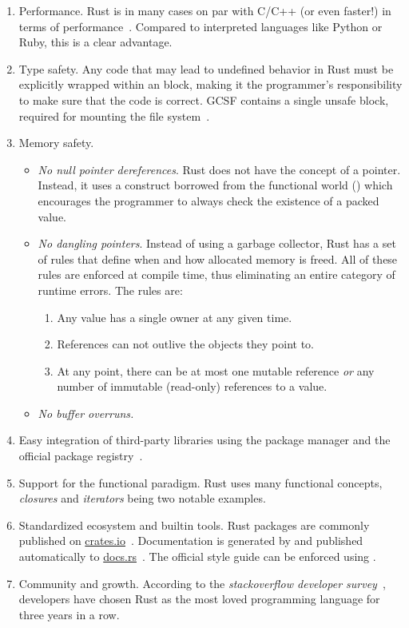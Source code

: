 \begin{enumerate}
  \itemsep0em
  \item Performance. Rust is in many cases on par with C/C++ (or even faster!) in terms of performance~\cite{rust_vs_cpp_benchmark}. Compared to interpreted languages like Python or Ruby, this is a clear advantage.
  \item Type safety. Any code that may lead to undefined behavior in Rust must be explicitly wrapped within an  block, making it the programmer's responsibility to make sure that the code is correct. GCSF contains a single unsafe block, required for mounting the file system~\cite{fuse_spawn_mount_unsafe}.
  \item Memory safety.
    \begin{itemize}
      \itemsep0em
      \item \emph{No null pointer dereferences}. Rust does not have the concept of a  pointer. Instead, it uses a construct borrowed from the functional world () which encourages the programmer to always check the existence of a packed value.
      \item \emph{No dangling pointers}. Instead of using a garbage collector, Rust has a set of rules that define when and how allocated memory is freed. All of these rules are enforced at compile time, thus eliminating an entire category of runtime errors. The rules are:
      \begin{enumerate}
        \itemsep0em
        \item Any value has a single owner at any given time.
        \item References can not outlive the objects they point to.
        \item At any point, there can be at most one mutable reference \emph{or} any number of immutable (read-only) references to a value.
      \end{enumerate}
      \item \emph{No buffer overruns.}
    \end{itemize}
  \item Easy integration of third-party libraries using the  package manager and the official package registry~\cite{crates_io}.
  \item Support for the functional paradigm. Rust uses many functional concepts, \emph{closures} and \emph{iterators} being two notable examples.
  \item Standardized ecosystem and builtin tools. Rust packages are commonly published on \url{crates.io}~\cite{crates_io}. Documentation is generated by  and published automatically to \url{docs.rs}~\cite{docs_rs}. The official style guide can be enforced using .
  \item Community and growth. According to the \emph{stackoverflow developer survey}~\cite{stack_overflow_most_loved}, developers have chosen Rust as the most loved programming language for three years in a row.
\end{enumerate}

